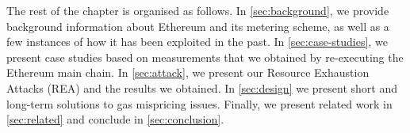  The rest of the chapter is organised as follows.
In \autoref{sec:background}, we provide background information about Ethereum and its metering scheme, as well as a few instances of how it has been exploited in the past.
In \autoref{sec:case-studies}, we present case studies based on measurements that we obtained by re-executing the Ethereum main chain.
In \autoref{sec:attack}, we present our Resource Exhaustion Attacks (REA) and the results we obtained. In \autoref{sec:design} we present short and long-term solutions to gas mispricing issues.
Finally, we present related work in \autoref{sec:related} and conclude in \autoref{sec:conclusion}.
